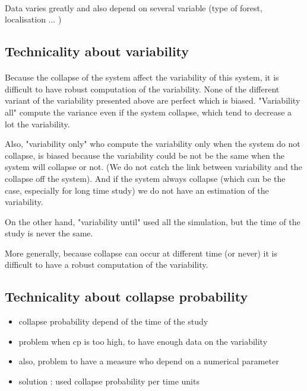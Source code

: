 \documentclass{article}
\begin{document}
\paragraph{}
Data varies greatly and also depend on several variable (type of forest, localisation ... )


\subsection{Technicality about variability}

\paragraph{}
Because the collapse of the system affect the variability of this system, it is difficult to have robust computation of the variability. None of the different variant of the variability presented above are perfect which is biased. "Variability all" compute the variance even if the system collapse, which tend to decrease a lot the variability. 
    
Also, "variability only" who compute the variability only when the system do not collapse, is biased because the variability could be not be the same when the system will collapse or not. (We do not catch the link between variability and the collapse off the system). And if the system always collapse (which can be the case, especially for long time study) we do not have an estimation of the variability. 

On the other hand, "variability until" used all the simulation, but the time of the study is never the same.

More generally, because collapse can occur at different time (or never) it is difficult to have a robust computation of the variability.



\subsection{Technicality about collapse probability}

\begin{itemize}
    \item collapse probability depend of the time of the study
    \item problem when cp is too high, to have enough data on the variability
    \item also, problem to have a measure who depend on a numerical parameter
    \item solution : used collapse probability per time units
\end{itemize}
\end{document}
